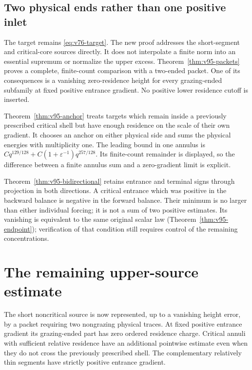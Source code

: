 \documentclass[11pt,reqno]{amsart}
\numberwithin{equation}{section}
\theoremstyle{definition}\newtheorem{definition}[theorem]{Definition}
\theoremstyle{remark}\newtheorem{remark}[theorem]{Remark}
\theoremstyle{definition}\newtheorem{inputstatement}[theorem]{Input statement}
\begin{document}


\subsection{Two physical ends rather than one positive inlet}
The target remains \eqref{eq:v76-target}. The new proof addresses the
short-segment and critical-core sources directly. It does not interpolate
a finite norm into an essential supremum or normalize the upper excess.
Theorem~\ref{thm:v95-packets} proves a complete, finite-count comparison
with a two-ended packet. One of its consequences is a vanishing
zero-residence height for every grazing-ended subfamily at fixed positive
entrance gradient. No positive lower residence cutoff is inserted.

Theorem~\ref{thm:v95-anchor} treats targets which remain inside a
previously prescribed critical shell but have enough residence on the
scale of their own gradient. It chooses an anchor on either physical
side and sums the physical energies with multiplicity one. The leading
bound in one annulus is $Cq^{129/128}+C(1+\varepsilon^{-1})q^{257/128}$.
Its finite-count remainder is displayed, so the difference between a
finite annulus sum and a zero-gradient limit is explicit.

Theorem~\ref{thm:v95-bidirectional} retains entrance and terminal signs
through projection in both directions. A critical entrance which was
positive in the backward balance is negative in the forward balance.
Their minimum is no larger than either individual forcing; it is
not a sum of two positive estimates. Its vanishing is equivalent to the
same original scalar law (Theorem~\ref{thm:v95-endpoint}); verification
of that condition still requires control of the remaining concentrations.






\section{The remaining upper-source estimate}
The short noncritical source is now represented, up to a vanishing
height error, by a packet requiring two nongrazing physical traces.
At fixed positive entrance gradient its grazing-ended part has zero
ordered residence charge. Critical
annuli with sufficient relative residence have an additional
pointwise estimate even when they do not cross the previously
prescribed shell. The complementary relatively thin segments have
strictly positive entrance gradient.
\end{document}
